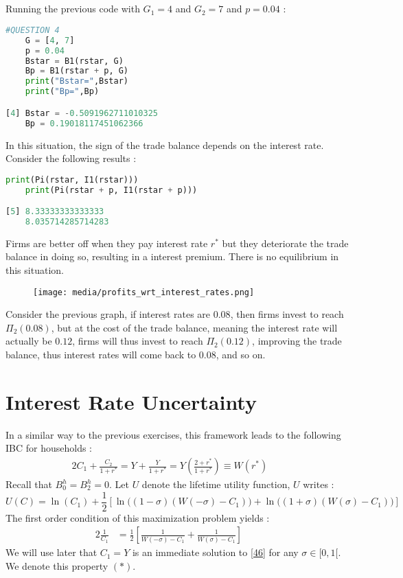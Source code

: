 \documentclass{article}
\begin{document}
\subsection{}
Running the previous code with $G_1 = 4$ and $G_2 = 7$ and $p = 0.04$ :
\begin{lstlisting}[language=Python, label=python_code]
    #QUESTION 4
    G = [4, 7]
    p = 0.04
    Bstar = B1(rstar, G)
    Bp = B1(rstar + p, G)
    print("Bstar=",Bstar)
    print("Bp=",Bp)

[4] Bstar = -0.5091962711010325
    Bp = 0.19018117451062366
\end{lstlisting}
In this situation, the sign of the trade balance depends on the interest rate. Consider the following results :
\begin{lstlisting}[language=Python, label=python_code]
    print(Pi(rstar, I1(rstar)))
    print(Pi(rstar + p, I1(rstar + p)))

[5] 8.33333333333333
    8.035714285714283
\end{lstlisting}
Firms are better off when they pay interest rate $r^*$ but they deteriorate the trade balance in doing so, resulting in a interest premium. There is no equilibrium in this situation.
\begin{figure}[H]
    \centering
    \texttt{[image: media/profits\_wrt\_interest\_rates.png]}
    \label{fig:mon_graphique}
\end{figure}
Consider the previous graph, if interest rates are $0.08$, then firms invest to reach $\Pi_2(0.08)$, but at the cost of the trade balance, meaning the interest rate will actually be $0.12$, firms will thus invest to reach $\Pi_2(0.12)$, improving the trade balance, thus interest rates will come back to $0.08$, and so on.
\newpage




\section{Interest Rate Uncertainty}
In a similar way to the previous exercises, this framework leads to the following IBC for households :
\begin{alignat}{2}
    C_1 + \frac{C_2}{1+r^*}  = Y + \frac{Y}{1+r^*} = Y\left(\frac{2+r^*}{1+r^*}\right) \equiv W(r^*) &\quad
\end{alignat}
Recall that $B_0^h = B_2^h = 0$.\newline
Let $U$ denote the lifetime utility function, $U$ writes : 
\begin{equation}
    U(C)  = \ln (C_1) + \frac{1}{2} \left[ \ln \Big((1-\sigma)(W(-\sigma)-C_1)\Big) + \ln \Big((1+\sigma)(W(\sigma)-C_1)\Big)\right]
\end{equation}
The first order condition of this maximization problem yields :
\begin{alignat}{2}
    \frac{1}{C_1}  &= \frac{1}{2}\left[ \frac{1}{W(-\sigma)-C_1} + \frac{1}{W(\sigma)- C_1}  \right]   &\quad\
    \label{46}
\end{alignat}
We will use later that $C_1 = Y$ is an immediate solution to \eqref{46} for any $\sigma \in [0, 1[$. We denote this property $(*)$. 
\end{document}
